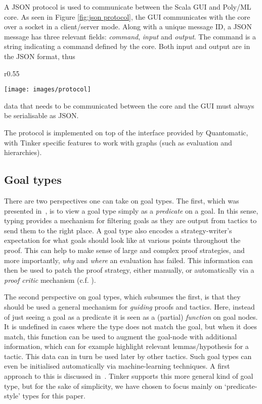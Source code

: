 \documentclass[submission,copyright,creativecommons]{eptcs}
\begin{document}
\noindent A JSON protocol is used to communicate between the Scala GUI and Poly/ML core. 
As seen in Figure \ref{fig:json protocol}, the GUI communicates with the core over a socket in a client/server mode.
Along with a unique message ID, a JSON message has three relevant fields: \textit{command}, \textit{input} and \textit{output}. 
The command is a string indicating a command defined by the core. 
Both input and output are in the JSON format, thus \begin{wrapfigure}[8]{r}{0.55\textwidth}
\vspace{-15pt}
\begin{center}
\texttt{[image: images/protocol]}
\end{center}
\vspace{-15pt}
\caption{Communication with JSON protocol}\label{fig:json protocol}
\end{wrapfigure}
data that needs to be communicated between the core and the GUI must always be serialisable as JSON.


The protocol is implemented on top of the interface provided by Quantomatic, with Tinker specific features to work with graphs (such as evaluation and hierarchies).


\subsection{Goal types}

There are two perspectives one can take on goal types. The first, which was presented in~\cite{LPAR13}, is to view a goal type simply as a \textit{predicate} on a goal. In this sense, typing provides a mechanism for filtering goals as they are output from tactics to send them to the right place. A goal type also encodes a strategy-writer's expectation for what goals should look like at various points throughout the proof. This can help to make sense of large and complex proof strategies, and more importantly, \emph{why} and \emph{where} an evaluation has failed. This information can then be used to patch the proof strategy, either manually, or automatically via a \emph{proof critic} mechanism (c.f. \cite{rippling-book}). 

The second perspective on goal types, which subsumes the first, is that they should be used a general mechanism for \emph{guiding} proofs and tactics. Here, instead of just seeing a goal as a predicate it is seen as
a (partial) \emph{function} on goal nodes. It is undefined in cases where the type does not match the goal, but when it does match, this function can be used to augment the goal-node with additional information, which can for example highlight relevant lemmas/hypothesis for a tactic. This data can in turn be used later by other tactics. Such goal types can even be initialised automatically via machine-learning techniques. A first approach to this is discussed in~\cite{grov13a}.  Tinker supports this more general kind of goal type, but for the sake of simplicity, we have chosen to focus mainly on `predicate-style' types for this paper.
\end{document}
